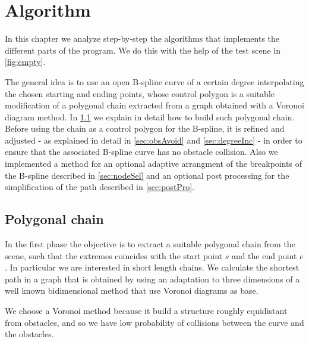 \documentclass[dissertation.tex]{subfiles}
\begin{document}
\chapter{Algorithm}
In this chapter we analyze step-by-step the algorithms that implements
the different parts of the program. We do this with the help of the
test scene in \cref{fig:empty}.

The general idea is to use an open B-spline curve of a certain degree
interpolating the chosen starting and ending points, whose
control polygon is a suitable modification of a polygonal chain
extracted from a graph
obtained with a Voronoi diagram method. In \cref{sec:polChain} we
explain in detail how to
build such polygonal chain. Before using the chain as a control
polygon for the B-spline, it is refined and adjusted - as explained in
detail in \cref{sec:obsAvoid} and \cref{sec:degreeInc} - in order to
ensure that the associated B-spline curve has no obstacle
collision. Also we implemented a method for an optional adaptive
arrangment of the breakpoints of the B-spline described in
\cref{sec:nodeSel} and an optional post processing for the
simplification of the path described in \cref{sec:postPro}.
\section{Polygonal chain}\label{sec:polChain}
In the first phase the objective is to extract a suitable polygonal chain from
the scene, such that the extremes coincides with the start point $s$
and the end point $e$. In particular we are interested in short length
chains. We calculate the shortest path
in a graph that is obtained by using an adaptation to three
dimensions of a well known bidimensional method
\cite{bhattacharya}\cite{ho-liu}\cite{seda-pich} that use
Voronoi diagrams as base.

We choose a Voronoi method because it build a structure roughly
equidistant from obstacles, and so we have low probability of
collisions between the curve and the obstacles.
\end{document}
